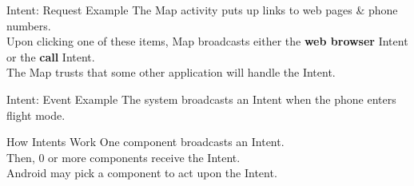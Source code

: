 \documentclass[aspectratio=169]{beamer}
\begin{document}
\begin{frame}{Intent: Request Example}
\Large
The Map activity puts up links to web pages 
\& phone numbers. \\
\vspace{1em}
Upon clicking one of these items, Map broadcasts either the \textbf{web browser}
Intent or the \textbf{call} Intent. \\
\vspace{1em}
The Map trusts that some other application will handle the Intent.
\end{frame}



\begin{frame}{Intent: Event Example}
\Large
The system broadcasts an Intent when the phone
enters flight mode.
\end{frame}



\begin{frame}{How Intents Work}
\Large
One component broadcasts an Intent. \\
\vspace{1em}
Then, 0 or more components receive the Intent. \\
\vspace{1em}
Android may pick a component to act upon the Intent.
\end{frame}
\end{document}
